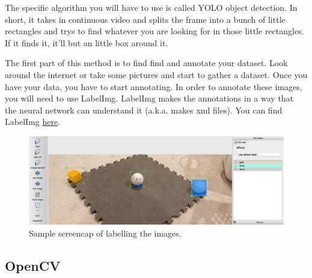 \documentclass[../main.tex]{subfiles}
\begin{document}
The specific algorithm you will have to use is called YOLO object detection. In short, it takes in continuous video and splits the frame into a bunch of little rectangles and trys to find whatever you are looking for in those little rectangles. If it finds it, it'll but an little box around it. 

The first part of this method is to find find and annotate your dataset. Look around the internet or take some pictures and start to gather a dataset. Once you have your data, you have to start annotating. In order to annotate these images, you will need to use LabelImg. LabelImg makes the annotations in a way that the neural network can understand it (a.k.a. makes xml files). You can find LabelImg  \href{https://github.com/tzutalin/labelImg}{here}.

\begin{figure}[H]
    \includegraphics[width=400pt]{sections/vision/images/LabelImg.png}
    \caption{Sample screencap of labelling the images.}
\end{figure}

\subsection{OpenCV}
\end{document}
